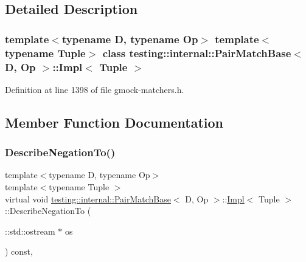 \subsection{Detailed Description}
\subsubsection*{template$<$typename D, typename Op$>$\newline
template$<$typename Tuple$>$\newline
class testing\+::internal\+::\+Pair\+Match\+Base$<$ D, Op $>$\+::\+Impl$<$ Tuple $>$}



Definition at line 1398 of file gmock-\/matchers.\+h.



\subsection{Member Function Documentation}
\mbox{\label{classtesting_1_1internal_1_1PairMatchBase_1_1Impl_ac687a0bd4df52f60a25ef9bf31b269db}} 
\subsubsection{\texorpdfstring{Describe\+Negation\+To()}{DescribeNegationTo()}}
{\footnotesize\ttfamily template$<$typename D, typename Op$>$ \\
template$<$typename Tuple $>$ \\
virtual void \hyperlink{classtesting_1_1internal_1_1PairMatchBase}{testing\+::internal\+::\+Pair\+Match\+Base}$<$ D, Op $>$\+::\hyperlink{classtesting_1_1internal_1_1PairMatchBase_1_1Impl}{Impl}$<$ Tuple $>$\+::Describe\+Negation\+To (\begin{DoxyParamCaption}\item[{\+::std\+::ostream $\ast$}]{os }\end{DoxyParamCaption}) const\hspace{0.3cm}{\ttfamily [inline]}, {\ttfamily [virtual]}}




